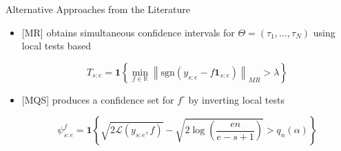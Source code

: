 \documentclass{beamer}
\begin{document}
\begin{frame}{Alternative Approaches from the Literature}

\begin{itemize}
	\item \textbf{\cite{fryzlewicz2021robust}} [MR] obtains  simultaneous confidence intervals for $\Theta = \left  ( \tau_1, \dots, \tau_N \right )$ using local tests based

\begin{equation*}
	T_{s:e} = \mathbf{1} \left \{ \min_{f \in \mathbb{R}} \left \| \text{sgn}(y_{s:e} - f \boldsymbol{1}_{s:e}) \right \|_{MR} > \lambda \right \} 
\end{equation*}	

\bigskip

	\item \textbf{\cite{jula2021multiscale}} [MQS] produces a confidence set for $f^\circ$ by inverting local tests
	
\begin{equation*}
\psi_{s:e}^f = \mathbf{1} \left \{ \sqrt{2 \mathcal{L} \left ( y_{s:e}, f \right )} - \sqrt{2 \log \left ( \frac{e n}{e-s+1} \right )} > q_n \left ( \alpha \right ) \right \}
\end{equation*}
\end{itemize}

\end{frame}
\end{document}
